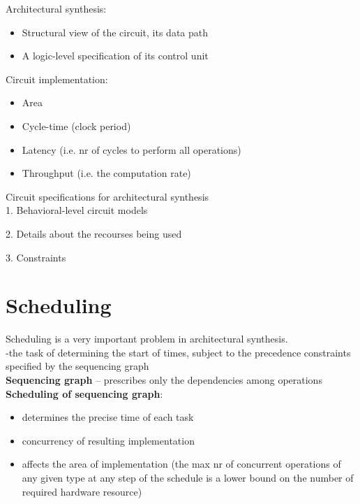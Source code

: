 \documentclass[conference]{IEEEtran}
\begin{document}
Architectural synthesis:

\begin{itemize}
  \item Structural view of the circuit, its data path
  \item A logic-level specification of its control unit\\
\end{itemize}

Circuit implementation:
\begin{itemize}

  \item Area
  \item Cycle-time (clock period)
  \item Latency (i.e. nr of cycles to perform all operations)
  \item Throughput (i.e. the computation rate)\\
\end{itemize}

Circuit specifications for architectural synthesis\\

1. Behavioral-level circuit models

2. Details about the recourses being used

3. Constraints

\section{Scheduling}

Scheduling is a very important problem in architectural synthesis.\\

-the task of determining the start of times, subject to the precedence constraints specified by the sequencing graph\\

\textbf{Sequencing graph} – prescribes only the dependencies among operations\\

\textbf{Scheduling of sequencing graph}:

\begin{itemize}

\item determines the precise time of each task
\item concurrency of resulting implementation
\item affects the area of implementation (the max nr of concurrent operations of any given type at any step of the schedule is a lower bound on the number of required hardware resource)
\end{itemize}
\end{document}
